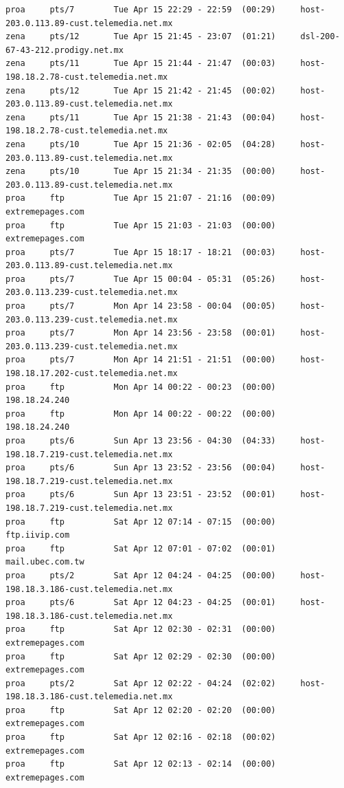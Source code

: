 \begin{lstlisting}[style=terminal]
proa     pts/7        Tue Apr 15 22:29 - 22:59  (00:29)     host-203.0.113.89-cust.telemedia.net.mx
zena     pts/12       Tue Apr 15 21:45 - 23:07  (01:21)     dsl-200-67-43-212.prodigy.net.mx
zena     pts/11       Tue Apr 15 21:44 - 21:47  (00:03)     host-198.18.2.78-cust.telemedia.net.mx
zena     pts/12       Tue Apr 15 21:42 - 21:45  (00:02)     host-203.0.113.89-cust.telemedia.net.mx
zena     pts/11       Tue Apr 15 21:38 - 21:43  (00:04)     host-198.18.2.78-cust.telemedia.net.mx
zena     pts/10       Tue Apr 15 21:36 - 02:05  (04:28)     host-203.0.113.89-cust.telemedia.net.mx
zena     pts/10       Tue Apr 15 21:34 - 21:35  (00:00)     host-203.0.113.89-cust.telemedia.net.mx
proa     ftp          Tue Apr 15 21:07 - 21:16  (00:09)     extremepages.com
proa     ftp          Tue Apr 15 21:03 - 21:03  (00:00)     extremepages.com
proa     pts/7        Tue Apr 15 18:17 - 18:21  (00:03)     host-203.0.113.89-cust.telemedia.net.mx
proa     pts/7        Tue Apr 15 00:04 - 05:31  (05:26)     host-203.0.113.239-cust.telemedia.net.mx
proa     pts/7        Mon Apr 14 23:58 - 00:04  (00:05)     host-203.0.113.239-cust.telemedia.net.mx
proa     pts/7        Mon Apr 14 23:56 - 23:58  (00:01)     host-203.0.113.239-cust.telemedia.net.mx
proa     pts/7        Mon Apr 14 21:51 - 21:51  (00:00)     host-198.18.17.202-cust.telemedia.net.mx
proa     ftp          Mon Apr 14 00:22 - 00:23  (00:00)     198.18.24.240
proa     ftp          Mon Apr 14 00:22 - 00:22  (00:00)     198.18.24.240
proa     pts/6        Sun Apr 13 23:56 - 04:30  (04:33)     host-198.18.7.219-cust.telemedia.net.mx
proa     pts/6        Sun Apr 13 23:52 - 23:56  (00:04)     host-198.18.7.219-cust.telemedia.net.mx
proa     pts/6        Sun Apr 13 23:51 - 23:52  (00:01)     host-198.18.7.219-cust.telemedia.net.mx
proa     ftp          Sat Apr 12 07:14 - 07:15  (00:00)     ftp.iivip.com
proa     ftp          Sat Apr 12 07:01 - 07:02  (00:01)     mail.ubec.com.tw
proa     pts/2        Sat Apr 12 04:24 - 04:25  (00:00)     host-198.18.3.186-cust.telemedia.net.mx
proa     pts/6        Sat Apr 12 04:23 - 04:25  (00:01)     host-198.18.3.186-cust.telemedia.net.mx
proa     ftp          Sat Apr 12 02:30 - 02:31  (00:00)     extremepages.com
proa     ftp          Sat Apr 12 02:29 - 02:30  (00:00)     extremepages.com
proa     pts/2        Sat Apr 12 02:22 - 04:24  (02:02)     host-198.18.3.186-cust.telemedia.net.mx
proa     ftp          Sat Apr 12 02:20 - 02:20  (00:00)     extremepages.com
proa     ftp          Sat Apr 12 02:16 - 02:18  (00:02)     extremepages.com
proa     ftp          Sat Apr 12 02:13 - 02:14  (00:00)     extremepages.com

\end{lstlisting}
